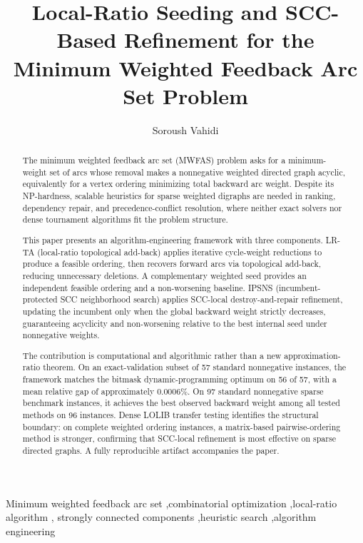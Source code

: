 \documentclass[preprint,12pt,authoryear]{elsarticle}
\begin{document}
\begin{frontmatter}

\title{Local-Ratio Seeding and SCC-Based Refinement for the\\ Minimum Weighted Feedback Arc Set Problem}

\author[inst1]{Soroush Vahidi}
\address[inst1]{Department of Computer Science, New Jersey Institute of Technology, Newark, NJ 07102, USA}

\begin{abstract}
The minimum weighted feedback arc set (MWFAS) problem asks for a minimum-weight set of arcs whose removal makes a nonnegative weighted directed graph acyclic, equivalently for a vertex ordering minimizing total backward arc weight. Despite its NP-hardness, scalable heuristics for sparse weighted digraphs are needed in ranking, dependency repair, and precedence-conflict resolution, where neither exact solvers nor dense tournament algorithms fit the problem structure.

This paper presents an algorithm-engineering framework with three components. LR-TA (local-ratio topological add-back) applies iterative cycle-weight reductions to produce a feasible ordering, then recovers forward arcs via topological add-back, reducing unnecessary deletions. A complementary weighted seed provides an independent feasible ordering and a non-worsening baseline. IPSNS (incumbent-protected SCC neighborhood search) applies SCC-local destroy-and-repair refinement, updating the incumbent only when the global backward weight strictly decreases, guaranteeing acyclicity and non-worsening relative to the best internal seed under nonnegative weights.

The contribution is computational and algorithmic rather than a new approximation-ratio theorem. On an exact-validation subset of 57 standard nonnegative instances, the framework matches the bitmask dynamic-programming optimum on 56 of 57, with a mean relative gap of approximately 0.0006\%. On 97 standard nonnegative sparse benchmark instances, it achieves the best observed backward weight among all tested methods on 96 instances. Dense LOLIB transfer testing identifies the structural boundary: on complete weighted ordering instances, a matrix-based pairwise-ordering method is stronger, confirming that SCC-local refinement is most effective on sparse directed graphs. A fully reproducible artifact accompanies the paper.
\end{abstract}

\begin{keyword}
Minimum weighted feedback arc set \sep combinatorial optimization \sep local-ratio algorithm \sep
strongly connected components \sep heuristic search \sep algorithm engineering
\end{keyword}

\end{frontmatter}
\end{document}

